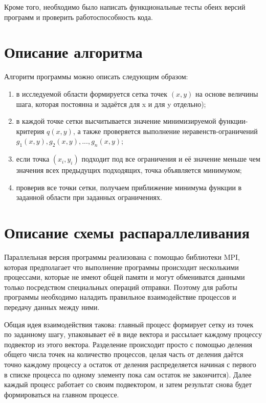 \documentclass[12pt]{article}
\begin{document}
Кроме того, необходимо было написать функциональные тесты обеих версий программ и проверить работоспособность кода.

\section{Описание алгоритма}
Алгоритм программы можно описать следующим образом:
\begin{enumerate}
    \item в исследуемой области формируется сетка точек \textit{$(x, y)$} на основе величины шага, которая постоянна и задаётся для x и для y отдельно);
    \item в каждой точке сетки высчитывается значение минимизируемой функции-критерия \textit{$q(x, y)$}, а также проверяется выполнение неравенств-ограничений \textit{$g_1(x, y), g_2(x, y), ..., g_n(x, y)$};
    \item если точка \textit{$(x_i, y_i)$} подходит под все ограничения и её значение меньше чем значения всех предыдущих подходящих, точка объявляется минимумом;
    \item проверив все точки сетки, получаем приближение минимума функции в заданной области при заданных ограничениях.
\end{enumerate}



\section{Описание схемы распараллеливания}
Параллельная версия программы реализована с помощью библиотеки MPI, которая предполагает что выполнение программы происходит несколькими процессами, которые не имеют общей памяти и могут обмениватся данными только посредством специальных операций отправки. Поэтому для работы программы необходимо наладить правильное взаимодействие процессов и передачу данных между ними.

Общая идея взаимодействия такова: главный процесс формирует сетку из точек по заданному шагу, упаковывает её в виде вектора и рассылает каждому процессу подвектор из этого вектора. Разделение происходит просто с помощью деления общего числа точек на количество процессов, целая часть от деления даётся точно каждому процессу а остаток от деления распределяется начиная с первого в списке процесса по одному элементу пока сам остаток не закончится). Далее каждый процесс работает со своим подвектором, и затем результат снова будет формироваться на главном процессе.
\end{document}
